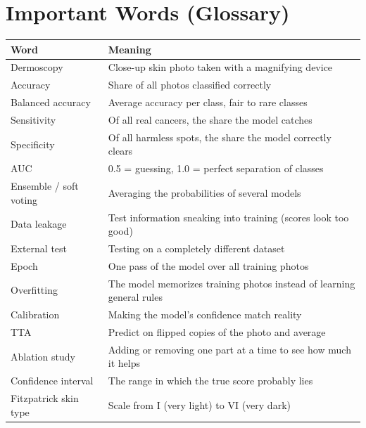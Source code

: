 \documentclass[11pt,a4paper]{article}
\begin{document}
\section{Important Words (Glossary)}
\par\smallskip
\begin{tabularx}{\linewidth}{@{}L{3.8cm} Y@{}}
\toprule
\textbf{Word} & \textbf{Meaning} \\
\midrule
Dermoscopy & Close-up skin photo taken with a magnifying device \\
Accuracy & Share of all photos classified correctly \\
Balanced accuracy & Average accuracy per class, fair to rare classes \\
Sensitivity & Of all real cancers, the share the model catches \\
Specificity & Of all harmless spots, the share the model correctly clears \\
AUC & 0.5 = guessing, 1.0 = perfect separation of classes \\
Ensemble / soft voting & Averaging the probabilities of several models \\
Data leakage & Test information sneaking into training (scores look too good) \\
External test & Testing on a completely different dataset \\
Epoch & One pass of the model over all training photos \\
Overfitting & The model memorizes training photos instead of learning general rules \\
Calibration & Making the model's confidence match reality \\
TTA & Predict on flipped copies of the photo and average \\
Ablation study & Adding or removing one part at a time to see how much it helps \\
Confidence interval & The range in which the true score probably lies \\
Fitzpatrick skin type & Scale from I (very light) to VI (very dark) \\
\bottomrule
\end{tabularx}

\end{document}
